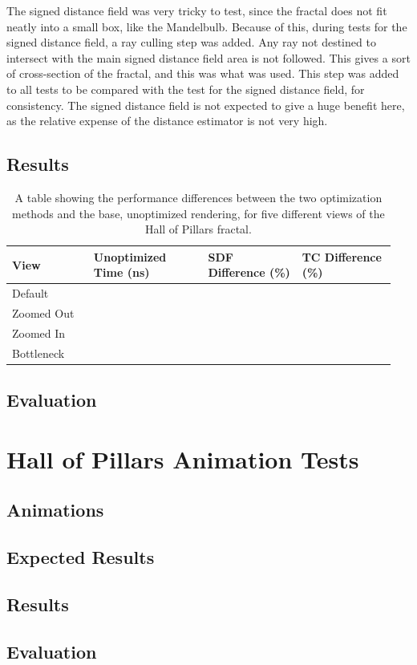 The signed distance field was very tricky to test, since the fractal does not fit neatly into a small box, like the Mandelbulb. Because of this, during tests for the signed distance field, a ray culling step was added. Any ray not destined to intersect with the main signed distance field area is not followed. This gives a sort of cross-section of the fractal, and this was what was used. This step was added to all tests to be compared with the test for the signed distance field, for consistency. The signed distance field is not expected to give a huge benefit here, as the relative expense of the distance estimator is not very high.

\subsection{Results}

\begin{table}[ht]
	\centering
	\begin{tabular}{||p{0.2\linewidth}|p{0.29\linewidth}|p{0.23\linewidth}|p{0.23\linewidth}||}
		\hline
		View & Unoptimized Time (ns) & SDF Difference (\%) & TC Difference (\%)\\
		\hline\hline
		Default &  &  & \\
		\hline
		Zoomed Out &  &  & \\
		\hline
		Zoomed In &  &  & \\
		\hline
		Bottleneck &  &  & \\
		\hline
	\end{tabular}
	\caption{A table showing the performance differences between the two optimization methods and the base, unoptimized rendering, for five different views of the Hall of Pillars fractal.}
	\label{table:hall-of-pillars-static-results}
\end{table}

\subsection{Evaluation}

\section{Hall of Pillars Animation Tests}

\subsection{Animations}

\subsection{Expected Results}

\subsection{Results}

\subsection{Evaluation}